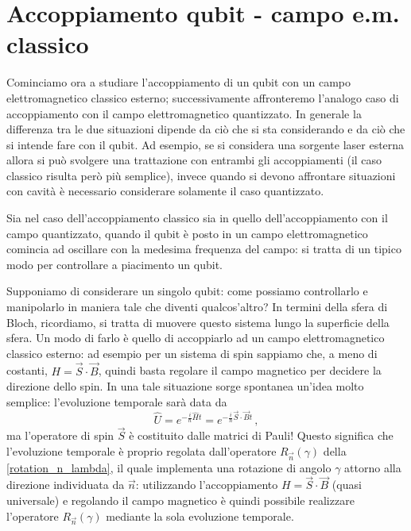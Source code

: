 \newpage

\section{Accoppiamento qubit - campo e.m. classico}\label{sec:qubit_campo_em_classico}
Cominciamo ora a studiare l'accoppiamento di un qubit con un campo elettromagnetico classico esterno; successivamente affronteremo l'analogo caso di accoppiamento con il campo elettromagnetico quantizzato. In generale la differenza tra le due situazioni dipende da ciò che si sta considerando e da ciò che si intende fare con il qubit. Ad esempio, se si considera una sorgente laser esterna allora si può svolgere una trattazione con entrambi gli accoppiamenti (il caso classico risulta però più semplice), invece quando si devono affrontare situazioni con cavità è necessario considerare solamente il caso quantizzato. 

\noindent Sia nel caso dell'accoppiamento classico sia in quello dell'accoppiamento con il campo quantizzato, quando il qubit è posto in un campo elettromagnetico comincia ad oscillare con la medesima frequenza del campo: si tratta di un tipico modo per controllare a piacimento un qubit.

\noindent Supponiamo di considerare un singolo qubit: come possiamo controllarlo e manipolarlo in maniera tale che diventi qualcos'altro? In termini della sfera di Bloch, ricordiamo, si tratta di muovere questo sistema lungo la superficie della sfera. Un modo di farlo è quello di accoppiarlo ad un campo elettromagnetico classico esterno: ad esempio per un sistema di spin sappiamo che, a meno di costanti, $H = \vec{S} \cdot \vec{B}$, quindi basta regolare il campo magnetico per decidere la direzione dello spin. In una tale situazione sorge spontanea un'idea molto semplice: l'evoluzione temporale sarà data da
\begin{equation*}
    \hat{U} = e^{-\frac{i}{\hbar} \hat{H} t} = e^{-\frac{i}{\hbar} \vec{S} \cdot \vec{B} t} \, ,
\end{equation*}
ma l'operatore di spin $\vec{S}$ è costituito dalle matrici di Pauli! Questo significa che l'evoluzione temporale è proprio regolata dall'operatore $R_{\vec{n}}(\gamma)$ della \eqref{rotation_n_lambda}, il quale implementa una rotazione di angolo $\gamma$ attorno alla direzione individuata da $\vec{n}$: utilizzando l'accoppiamento $H = \vec{S} \cdot \vec{B}$ (quasi universale) e regolando il campo magnetico è quindi possibile realizzare l'operatore $R_{\vec{n}}(\gamma)$ mediante la sola evoluzione temporale. 

